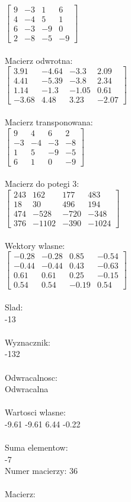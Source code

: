 \documentclass[a4paper,12pt]{article}
\begin{document}
$\begin{bmatrix} 9&-3&1&6\\4&-4&5&1\\6&-3&-9&0\\2&-8&-5&-9 \end{bmatrix}$
\\
\\
Macierz odwrotna:\\

$\begin{bmatrix} 3.91&-4.64&-3.3&2.09\\4.41&-5.39&-3.8&2.34\\1.14&-1.3&-1.05&0.61\\-3.68&4.48&3.23&-2.07 \end{bmatrix}$
\\
\\
Macierz transponowana:\\

$\begin{bmatrix} 9&4&6&2\\-3&-4&-3&-8\\1&5&-9&-5\\6&1&0&-9 \end{bmatrix}$
\\
\\
Macierz do potegi 3:\\

$\begin{bmatrix} 243&162&177&483\\18&30&496&194\\474&-528&-720&-348\\376&-1102&-390&-1024 \end{bmatrix}$
\\
\\
Wektory wlasne:\\

$\begin{bmatrix} -0.28&-0.28&0.85&-0.54\\-0.44&-0.44&0.43&-0.63\\0.61&0.61&0.25&-0.15\\0.54&0.54&-0.19&0.54 \end{bmatrix}$
\\
\\
Slad:\\
-13
\\
\\
Wyznacznik:\\
-132
\\
\\
Odwracalnosc:\\
Odwracalna
\\
\\
Wartosci wlasne:\\
-9.61 -9.61 6.44 -0.22
\\
\\
Suma elementow:\\
-7
\\
\newpage
Numer macierzy:
36
\\
\\
Macierz:\\
\end{document}
